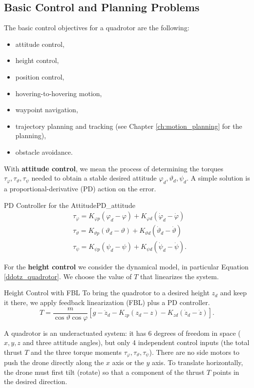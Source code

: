 \documentclass[10pt, a4paper]{report}
\begin{document}
\subsection{Basic Control and Planning Problems}\label{basic_control_planning}
The basic control objectives for a quadrotor are the following:\begin{itemize}
    \item attitude control,
    \item height control,
    \item position control,
    \item hovering-to-hovering motion,
    \item waypoint navigation, 
    \item trajectory planning and tracking (see Chapter \ref{ch:motion_planning} for the planning),
    \item obstacle avoidance. 
\end{itemize}
With \textbf{attitude control}, we mean the process of determining the torques $\tau_\varphi,\tau_\vartheta,\tau_\psi$ needed to obtain a stable desired attitude $\varphi_d,\vartheta_d,\psi_d$. A simple solution is a proportional-derivative (PD) action on the error.
\begin{boxdefinition}{PD Controller for the Attitude}{PD_attitude}
\begin{align}
    &\tau_\varphi=K_{\varphi p}(\varphi_d-\varphi)+K_{\varphi d}(\dot \varphi_d-\dot \varphi)\\
    &\tau_\vartheta=K_{\vartheta p}(\vartheta_d-\vartheta)+K_{\vartheta d}(\dot \vartheta_d-\dot \vartheta)\\
    &\tau_\psi=K_{\psi p}(\psi_d-\psi)+K_{\psi d}(\dot \psi_d-\dot \psi).
\end{align}
\end{boxdefinition}
\noindent For the \textbf{height control} we consider the dynamical model, in particular Equation \eqref{ddotz_quadrotor}. We choose the value of $T$ that linearizes the system. 
\begin{boxdefinition}{Height Control with FBL}{}
    To bring the quadrotor to a desired height $z_d$ and keep it there, we apply feedback linearization (FBL) plus a PD controller.
    \begin{equation}
            T=\frac{m}{\cos\vartheta\cos\varphi}[g-\ddot z_d-K_{zp}(z_d-z)-K_{zd}(\dot z_d-\dot z)].
    \end{equation}
\end{boxdefinition}
\begin{boxobservation}{}{}
A quadrotor is an underactuated system: it has 6 degrees of freedom in space ($x, y, z$ and three attitude angles), but only 4 independent control inputs (the total thrust $T$ and the three torque moments $\tau_\varphi, \tau_\vartheta, \tau_\psi$). There are no side motors to push the drone directly along the $x$ axis or the $y$ axis. To translate horizontally, the drone must first tilt (rotate) so that a component of the thrust $T$ points in the desired direction.
\end{boxobservation}
\end{document}
